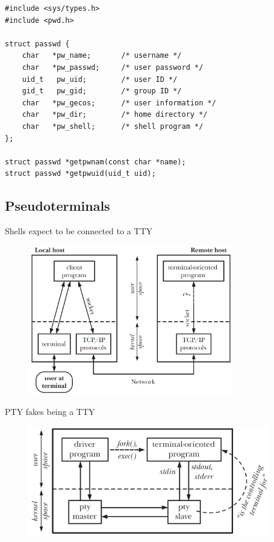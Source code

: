\documentclass[
	xcolor=dvipsnames,
]{beamer}
\newenvironment{zhawframe}[1][]
{\begin{frame}[environment=fr,#1]{\insertsectionhead}{\insertsubsectionhead}}
{\end{frame}
}
\begin{document}
\begin{frame}[fragile]{\insertsectionhead}{\insertsubsectionhead}
\lstset{
	style = basestyle,
	language = C,
}
\begin{lstlisting}
#include <sys/types.h>
#include <pwd.h>

struct passwd {
    char   *pw_name;       /* username */
    char   *pw_passwd;     /* user password */
    uid_t   pw_uid;        /* user ID */
    gid_t   pw_gid;        /* group ID */
    char   *pw_gecos;      /* user information */
    char   *pw_dir;        /* home directory */
    char   *pw_shell;      /* shell program */
};

struct passwd *getpwnam(const char *name);
struct passwd *getpwuid(uid_t uid);
\end{lstlisting}
\end{frame}

\subsection{Pseudoterminals}
\begin{zhawframe}
Shells expect to be connected to a TTY
\begin{figure}[ht]
\includegraphics[width=0.8\textwidth]{PseudoterminalProblem}
\end{figure}
\end{zhawframe}

\begin{zhawframe}
PTY fakes being a TTY
\begin{figure}[ht]
\includegraphics[width=0.94\textwidth]{Pseudoterminal}
\end{figure}
\end{zhawframe}
\end{document}
